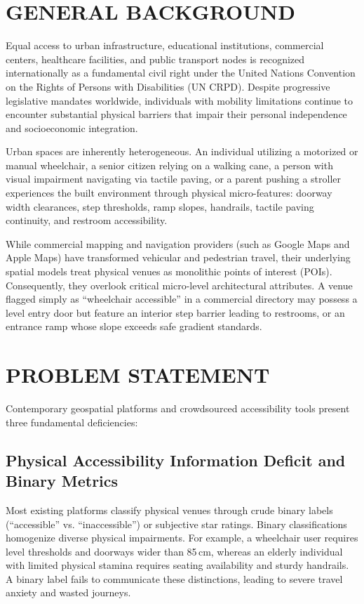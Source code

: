 \documentclass[12pt,a4paper]{report}
\begin{document}
\section{GENERAL BACKGROUND}
Equal access to urban infrastructure, educational institutions, commercial centers, healthcare facilities, and public transport nodes is recognized internationally as a fundamental civil right under the United Nations Convention on the Rights of Persons with Disabilities (UN CRPD). Despite progressive legislative mandates worldwide, individuals with mobility limitations continue to encounter substantial physical barriers that impair their personal independence and socioeconomic integration.

Urban spaces are inherently heterogeneous. An individual utilizing a motorized or manual wheelchair, a senior citizen relying on a walking cane, a person with visual impairment navigating via tactile paving, or a parent pushing a stroller experiences the built environment through physical micro-features: doorway width clearances, step thresholds, ramp slopes, handrails, tactile paving continuity, and restroom accessibility.

While commercial mapping and navigation providers (such as Google Maps and Apple Maps) have transformed vehicular and pedestrian travel, their underlying spatial models treat physical venues as monolithic points of interest (POIs). Consequently, they overlook critical micro-level architectural attributes. A venue flagged simply as ``wheelchair accessible'' in a commercial directory may possess a level entry door but feature an interior step barrier leading to restrooms, or an entrance ramp whose slope exceeds safe gradient standards.

\section{PROBLEM STATEMENT}
Contemporary geospatial platforms and crowdsourced accessibility tools present three fundamental deficiencies:

\subsection{Physical Accessibility Information Deficit and Binary Metrics}
Most existing platforms classify physical venues through crude binary labels (``accessible'' vs. ``inaccessible'') or subjective star ratings. Binary classifications homogenize diverse physical impairments. For example, a wheelchair user requires level thresholds and doorways wider than 85\,cm, whereas an elderly individual with limited physical stamina requires seating availability and sturdy handrails. A binary label fails to communicate these distinctions, leading to severe travel anxiety and wasted journeys.
\end{document}
